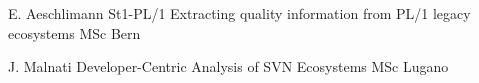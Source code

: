 \begin{enumerate}
\super 
	{E. Aeschlimann}
	{St1-PL/1
Extracting quality information from PL/1 legacy ecosystems}
	{MSc}
	{Bern}
	{}



\super 
	{J. Malnati}
	{Developer-Centric Analysis of SVN Ecosystems}
	{MSc}
	{Lugano}
	{}



\end{enumerate}